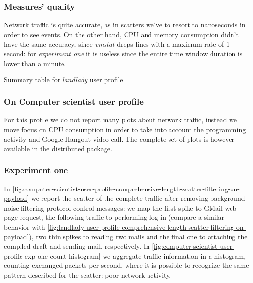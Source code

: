 \documentclass[10pt,a4paper]{article}
\begin{document}
    \subsubsection*{Measures' quality}
    Network traffic is quite accurate, as in scatters we've to resort
    to nanoseconds in order to see events. On the other hand, CPU and
    memory consumption didn't have the same accuracy, since
    \emph{vmstat} drops lines with a maximum rate of 1 second: for
    \emph{experiment one} it is useless since the entire time window
    duration is lower than a minute.
  

    \begin{table}
      \begin{adjustwidth}{-2cm}{}
        
      \end{adjustwidth}
      \caption{Summary table for \emph{landlady} user profile}
      \label{fig:landlady-user-profile}
    \end{table}

    \newpage

    \subsubsection{On Computer scientist user profile}
    For this profile we do not report many plots about network
    traffic, instead we move focus on CPU consumption in order to take
    into account the programming activity and Google Hangout video
    call. The complete set of plots is however available in the
    distributed package.
    
    \subsubsection*{Experiment one}
    In
    \autoref{fig:computer-scientist-user-profile-comprehensive-length-scatter-filtering-on-payload}
    we report the scatter of the complete traffic after removing
    background noise filtering protocol control messages: we map the
    first spike to GMail web page request, the following traffic to
    performing log in (compare a similar behavior with
    \autoref{fig:landlady-user-profile-comprehensive-length-scatter-filtering-on-payload}),
    two thin spikes to reading two mails and the final one to
    attaching the compiled draft and sending mail, respectively.  In
    \autoref{fig:computer-scientist-user-profile-exp-one-count-histogram}
    we aggregate traffic information in a histogram, counting
    exchanged packets per second, where it is possible to recognize
    the same pattern described for the scatter: poor network activity.
\end{document}

